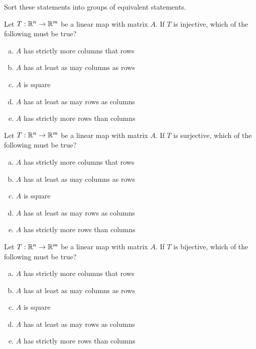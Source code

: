 \begin{applicationActivities}{2}{22}
\begin{activity}{15}
Sort these statements into groups of equivalent statements.

\end{activity}

\begin{activity}{5}
Let $T: \mathbb{R}^n \rightarrow \mathbb{R}^m$ be a linear map with matrix $A$.
If $T$ is injective, which of the following must be true?
\begin{enumerate}[(a)]
\item $A$ has strictly more columns that rows
\item $A$ has at least as may columns as rows
\item $A$ is square
\item $A$ has at least as may rows as columns
\item $A$ has strictly more rows than columns
\end{enumerate}
\end{activity}

\begin{activity}{5}
Let $T: \mathbb{R}^n \rightarrow \mathbb{R}^m$ be a linear map with matrix $A$.
If $T$ is surjective, which of the following must be true?
\begin{enumerate}[(a)]
\item $A$ has strictly more columns that rows
\item $A$ has at least as may columns as rows
\item $A$ is square
\item $A$ has at least as may rows as columns
\item $A$ has strictly more rows than columns
\end{enumerate}
\end{activity}

\begin{activity}{5}
Let $T: \mathbb{R}^n \rightarrow \mathbb{R}^m$ be a linear map with matrix $A$.
If $T$ is bijective, which of the following must be true?
\begin{enumerate}[(a)]
\item $A$ has strictly more columns that rows
\item $A$ has at least as may columns as rows
\item $A$ is square
\item $A$ has at least as may rows as columns
\item $A$ has strictly more rows than columns
\end{enumerate}
\end{activity}

\end{applicationActivities}

